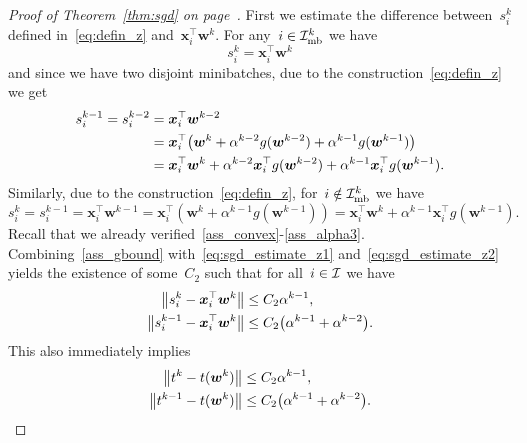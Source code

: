 \begin{proof}[Proof of Theorem~\ref{thm:sgd} on page~\pageref{thm:sgd}]
  First we estimate the difference between~$s_i^k$ defined in~\eqref{eq:defin_z} and~$\bm{x}_i^\top \bm{w}^k$. For any~$i \in \mathcal{I}_{\text{mb}}^k$ we have
  \begin{equation*}
    s_i^k = \bm{x}_i^\top \bm{w}^k
  \end{equation*}
  and since we have two disjoint minibatches, due to the construction~\eqref{eq:defin_z} we get
  \begin{equation}\label{eq:sgd_estimate_z1}
    \begin{aligned}
      s_i^{k-1}
          = s_i^{k-2}
        & = \bm{x}_i^\top \bm{w}^{k-2} \\
        & = \bm{x}_i^\top \Brac{\bm{w}^k + \alpha^{k-2}g(\bm{w}^{k-2}) + \alpha^{k-1} g(\bm{w}^{k-1})} \\
        & = \bm{x}_i^\top \bm{w}^k + \alpha^{k-2}\bm{x}_i^\top g(\bm{w}^{k-2}) + \alpha^{k-1}\bm{x}_i^\top g(\bm{w}^{k-1}).
    \end{aligned}
  \end{equation}
  Similarly, due to the construction~\eqref{eq:defin_z}, for~$i \notin \mathcal{I}_{\text{mb}}^k$ we have
  \begin{equation}\label{eq:sgd_estimate_z2}
    s_i^k
    = s_i^{k-1}
    = \bm{x}_i^\top \bm{w}^{k-1}
    = \bm{x}_i^\top (\bm{w}^k+\alpha^{k-1}g(\bm{w}^{k-1}))
    = \bm{x}_i^\top \bm{w}^k + \alpha^{k-1}\bm{x}_i^\top g(\bm{w}^{k-1}).
  \end{equation}
  Recall that we already verified~\ref{ass_convex}-\ref{ass_alpha3}. Combining~\ref{ass_gbound} with~\eqref{eq:sgd_estimate_z1} and~\eqref{eq:sgd_estimate_z2} yields the existence of some~$C_2$ such that for all~$i \in \mathcal{I}$ we have
  \begin{equation}\label{eq:estimate_diff_z}
    \begin{aligned}
      \norm{s_i^k - \bm{x}_i^\top \bm{w}^k} &\le C_2\alpha^{k-1}, \\
      \norm{s_i^{k-1} - \bm{x}_i^\top \bm{w}^k} &\le C_2\Brac{\alpha^{k-1}+\alpha^{k-2}}. \\
    \end{aligned}
  \end{equation}
  This also immediately implies
  \begin{equation}\label{eq:estimate_diff_t}
    \begin{aligned}
      \norm{t^k - t(\bm{w}^k)}     & \le C_2\alpha^{k-1}, \\
      \norm{t^{k-1} - t(\bm{w}^k)} & \le C_2\Brac{\alpha^{k-1}+\alpha^{k-2}}. \\
    \end{aligned}

\end{equation}
\end{proof}
